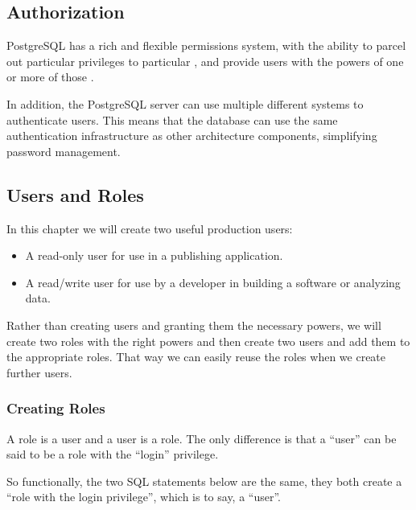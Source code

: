 \documentclass[a4paper,11pt,english]{sphinxmanual}
\begin{document}
\subsection{Authorization}
\label{\detokenize{maintenance:authorization}}
PostgreSQL has a rich and flexible permissions system, with the ability to parcel out particular privileges to particular , and provide users with the powers of one or more of those .

In addition, the PostgreSQL server can use multiple different systems to authenticate users. This means that the database can use the same authentication infrastructure as other architecture components, simplifying password management.


\subsection{Users and Roles}
\label{\detokenize{maintenance:users-and-roles}}
In this chapter we will create two useful production users:
\begin{itemize}
\item {} 
A read-only user for use in a publishing application.

\item {} 
A read/write user for use by a developer in building a software or analyzing data.

\end{itemize}

Rather than creating users and granting them the necessary powers, we will create two roles with the right powers and then create two users and add them to the appropriate roles. That way we can easily reuse the roles when we create further users.


\subsubsection{Creating Roles}
\label{\detokenize{maintenance:creating-roles}}
A role is a user and a user is a role. The only difference is that a “user” can be said to be a role with the “login” privilege.

So functionally, the two SQL statements below are the same, they both create a “role with the login privilege”, which is to say, a “user”.

\begin{sphinxVerbatim}[commandchars=\\\{\}]
   
  
\end{sphinxVerbatim}
\end{document}
